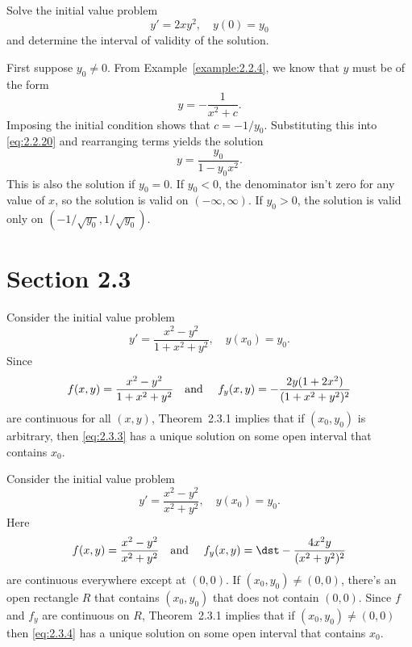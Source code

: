\setcounter{example}{5}
\begin{example}
  \label{example:2.2.6} \rm Solve the initial value problem
  \[
    y'=2xy^{2},\quad y(0)=y_{0}
  \]
  and determine the interval of validity of the solution.
\end{example}
\setcounter{equation}{19}
\begin{examplesolution}
\solution First suppose $y_{0}\ne0$. From Example~\ref{example:2.2.4}, we know that $y$ must be of
the form
\begin{equation}
  \label{eq:2.2.20}y=-\frac{1}{x^{2}+c}.
\end{equation}
Imposing the initial condition shows that $c=-1/y_{0}$. Substituting this into \eqref{eq:2.2.20} and
rearranging terms yields the solution
\[
  y=\frac{y_{0}}{1-y_{0}x^{2}}.
\]
This is also the solution if $y_{0}=0$. If $y_{0}<0$, the denominator isn't zero for any value of
$x$, so the solution is valid on $(-\infty,\infty)$. If $y_{0}>0$, the solution is valid only on
$(-1/\sqrt{y_{0}},1/\sqrt{y_{0}})$.
\end{examplesolution}

\section*{Section 2.3}
\setcounter{chapter}{2}
\setcounter{section}{3}

\setcounter{example}{0}
\setcounter{equation}{2}
\begin{example}
  \label{example:2.3.1} \rm Consider the initial value problem
  \begin{equation}
    \label{eq:2.3.3}y'=\frac{x^{2}-y^{2}}{1+x^{2}+y^{2}},\quad y(x_{0})=y_{0}.
  \end{equation}
  Since
  \[
    f(x,y)=\frac{x^{2}-y^{2}}{1+x^{2}+y^{2}}\mbox{\quad and \quad}f_{y}(x,y)=-\frac{2y(1+2x^{2})}{(1+x^{2}+y^{2})^{2}}
  \]
  are continuous for all $(x,y)$, Theorem~2.3.1 implies that if $(x_{0},y_{0})$ is
  arbitrary, then \eqref{eq:2.3.3} has a unique solution on some open interval that contains
  $x_{0}$.
\end{example}

\setcounter{example}{1}
\setcounter{equation}{3}
\begin{example}
  \label{example:2.3.2} \rm Consider the initial value problem
  \begin{equation}
    \label{eq:2.3.4}y'=\frac{x^{2}-y^{2}}{x^{2}+y^{2}},\quad y(x_{0})=y_{0}.
  \end{equation}
  Here
  \[
    f(x,y)=\frac{x^{2}-y^{2}}{x^{2}+y^{2}}\mbox{\quad and \quad}f_{y}(x,y)=\dst-\frac{4x^{2}y}{(x^{2}+y^{2})^{2}}
  \]
  are continuous everywhere except at $(0,0)$. If $(x_{0},y_{0}) \ne(0,0)$, there's an open
  rectangle $R$ that contains $(x_{0},y_{0})$ that does not contain $(0,0)$. Since $f$ and $f_{y}$
  are continuous on $R$, Theorem~2.3.1 implies that if $(x_{0},y_{0})\ne(0,0)$ then
  \eqref{eq:2.3.4} has a unique solution on some open interval that contains $x_{0}$.
\end{example}

